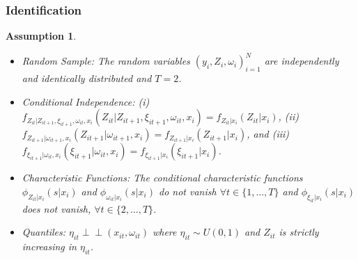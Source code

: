 \documentclass[xcolor={dvipsnames}, notheorems]{beamer}
\theoremstyle{plain}
\newtheorem{assump}{Assumption}
\newcommand{\indep}{\perp \!\!\! \perp}
\begin{document}

\begin{frame}
\frametitle{Identification}
\begin{assump}\label{idpart1}
\begin{itemize}
    \item Random Sample: The random variables $(y_{i}, Z_{i}, \omega_{i})_{i=1}^{N}$ are independently and identically distributed and $T=2$.
    \item Conditional Independence: (i) $f_{Z_{it}|Z_{it+1}, \xi_{it+1}, \omega_{it}, x_{i}}(Z_{it}|Z_{it+1}, \xi_{it+1}, \omega_{it}, x_{i})=f_{Z_{it}|x_{i}}(Z_{it}|x_{i})$, (ii) $f_{Z_{it+1}|\omega_{it+1}, x_{i}}(Z_{it+1}|\omega_{it+1}, x_{i})=f_{Z_{it+1}|x_{i}}(Z_{it+1}|x_{i})$,  and (iii) $f_{\xi_{it+1}|\omega_{it}, x_{i}}(\xi_{it+1}|\omega_{it}, x_{i})=f_{\xi_{it+1}|x_{i}}(\xi_{it+1}|x_{i})$.
    \item Characteristic Functions: The conditional characteristic functions $\phi_{Z_{it}|x_{i}}(s|x_{i})$ and $\phi_{\omega_{it}|x_{i}}(s|x_{i})$ do not vanish $\forall t\in\{1,\dots,T\}$ and $\phi_{\xi_{it}|x_{i}}(s|x_{i})$  does not vanish, $\forall t\in\{2,\dots,T\}$.
    \item Quantiles: $\eta_{it}\indep (x_{it}, \omega_{it})$ where $\eta_{it}\sim U(0,1)$ and $Z_{it}$ is strictly increasing in $\eta_{it}$.
\end{itemize}
\end{assump}
\end{frame}

\end{document}
